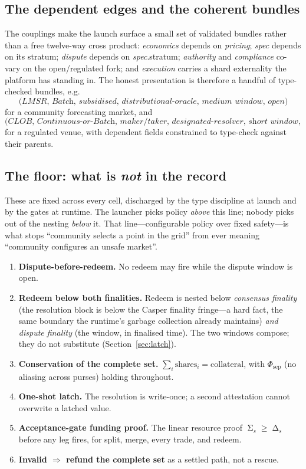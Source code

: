 \documentclass[11pt]{article}
\DeclareMathOperator{\Demand}{\Delta}
\DeclareMathOperator{\Supply}{\Sigma}
\begin{document}
\subsection{The dependent edges and the coherent bundles}

The couplings make the launch surface a small set of validated bundles rather than a free
twelve-way cross product: \textit{economics} depends on \textit{pricing}; \textit{spec}
depends on its stratum; \textit{dispute} depends on \textit{spec}.stratum; \textit{authority}
and \textit{compliance} co-vary on the open/regulated fork; and \textit{execution} carries a
shard externality the platform has standing in. The honest presentation is therefore a handful
of type-checked bundles, e.g.\
\[
\textit{(LMSR, Batch, subsidised, distributional-oracle, medium window, open)}
\]
for a community forecasting market, and
\[
\textit{(CLOB, Continuous-or-Batch, maker/taker, designated-resolver, short window, gated)}
\]
for a regulated venue, with dependent fields constrained to type-check against their parents.

\subsection{The floor: what is \emph{not} in the record}\label{sec:floor}

These are fixed across every cell, discharged by the type discipline at launch and by the
gates at runtime. The launcher picks policy \emph{above} this line; nobody picks out of the
nesting \emph{below} it. That line---configurable policy over fixed safety---is what stops
``community selects a point in the grid'' from ever meaning ``community configures an unsafe
market''.

\begin{enumerate}[leftmargin=1.6em,itemsep=0.2em]
\item \textbf{Dispute-before-redeem.} No redeem may fire while the dispute window is open.
\item \textbf{Redeem below both finalities.} Redeem is nested below \emph{consensus finality}
(the resolution block is below the Casper finality fringe---a hard fact, the same boundary the
runtime's garbage collection already maintains) \emph{and} \emph{dispute finality} (the window,
in finalised time). The two windows compose; they do not substitute (Section~\ref{sec:latch}).
\item \textbf{Conservation of the complete set.} $\sum_i \text{shares}_i = \text{collateral}$,
with $\Phi_{\mathrm{sep}}$ (no aliasing across purses) holding throughout.
\item \textbf{One-shot latch.} The resolution is write-once; a second attestation cannot
overwrite a latched value.
\item \textbf{Acceptance-gate funding proof.} The linear resource proof
$\Supply_s \ge \Demand_s$ before any leg fires, for \textsf{split}, \textsf{merge}, every
trade, and \textsf{redeem}.
\item \textbf{Invalid $\Rightarrow$ refund the complete set} as a settled path, not a rescue.
\end{enumerate}
\end{document}
